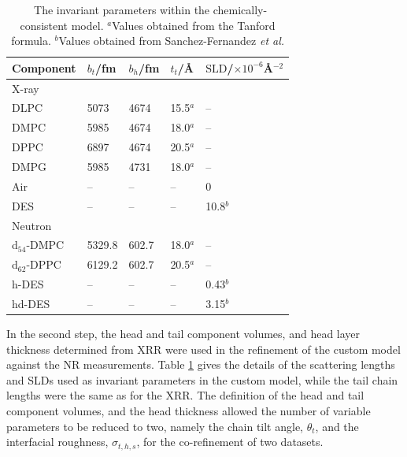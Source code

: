 \documentclass[twoside,twocolumn,9pt]{article}
\begin{document}
%
\begin{table}[h]
	\small
	\caption{\ The invariant parameters within the chemically-consistent model.
	$^a$Values obtained from the Tanford formula.\cite{Tanford1980} $^b$Values obtained from Sanchez-Fernandez \emph{et al.}\cite{Sanchez-Fernandez2016}}
	\label{tab:invariant}
	\begin{tabular*}{0.48\textwidth}{@{\extracolsep{\fill}}lllll}
		\hline
		Component & $b_t$/fm & $b_h$/fm & $t_t$/\AA & $\text{SLD}$/$\times10^{-6}$\AA$^{-2}$ \\
		\hline
		X-ray & & & & \\
		DLPC & 5073 & 4674 & 15.5$^a$ & -- \\
		DMPC & 5985 & 4674 & 18.0$^a$ & -- \\
		DPPC & 6897 & 4674 & 20.5$^a$ & -- \\
		DMPG & 5985 & 4731 & 18.0$^a$ & --\\
		Air & -- & -- & -- & 0\\
		DES & -- & -- & -- & 10.8$^b$ \\
		\hline
		Neutron & & & & \\
		d$_{54}$-DMPC & 5329.8 & 602.7 & 18.0$^a$ & -- \\
		d$_{62}$-DPPC & 6129.2 & 602.7 & 20.5$^a$ & -- \\
		h-DES & -- & -- & -- & 0.43$^b$  \\
		hd-DES & -- & -- & -- & 3.15$^b$ \\
		\hline
	\end{tabular*}
\end{table}
%
In the second step, the head and tail component volumes, and head layer thickness determined from XRR were used in the refinement of the custom model against the NR measurements. Table \ref{tab:invariant} gives the details of the scattering lengths and SLDs used as invariant parameters in the custom model, while the tail chain lengths were the same as for the XRR. The definition of the head and tail component volumes, and the head thickness allowed the number of variable parameters to be reduced to two, namely the chain tilt angle, $\theta_t$, and the interfacial roughness, $\sigma_{t,h,s}$, for the co-refinement of two datasets.
\end{document}
